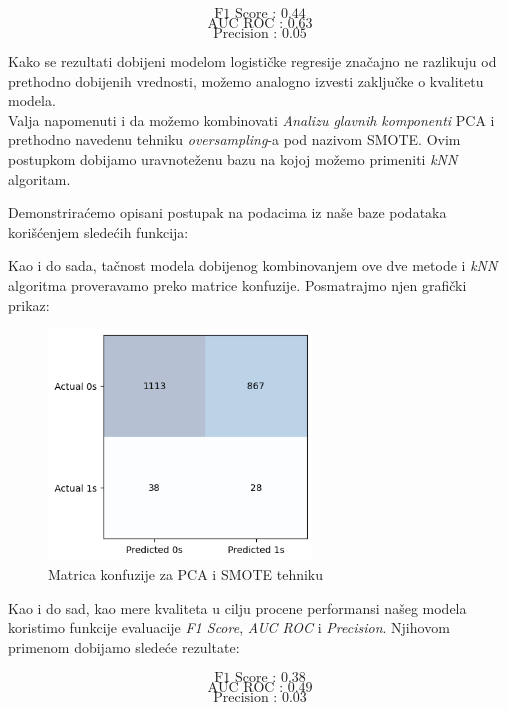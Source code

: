 \documentclass[12pt]{article}
\theoremstyle{definition}
\theoremstyle{remark}
\begin{document}
\hfill

$$
\text{F1 Score : 0.44}
$$
$$
\text{AUC ROC : 0.63}
$$
$$
\text{Precision : 0.05}
$$
\hfill

Kako se rezultati dobijeni modelom logističke regresije značajno ne razlikuju od prethodno dobijenih vrednosti, možemo analogno izvesti zaključke o kvalitetu modela.\\


Valja napomenuti i da možemo kombinovati \emph{Analizu glavnih komponenti} PCA i prethodno navedenu tehniku \emph{oversampling}-a pod nazivom SMOTE. Ovim postupkom dobijamo uravnoteženu bazu na kojoj možemo primeniti \emph{kNN} algoritam. 

Demonstriraćemo opisani postupak na podacima iz naše baze podataka korišćenjem sledećih funkcija:

\hfill


Kao i do sada, tačnost modela dobijenog kombinovanjem ove dve metode i \emph{kNN} algoritma proveravamo preko matrice konfuzije. Posmatrajmo njen grafički prikaz:
 
\begin{figure}[htp]
    \centering
    \includegraphics[width=7cm]{output_39_0.png}
    \caption{Matrica konfuzije za PCA i SMOTE tehniku}
    \label{fig:galaxy}
\end{figure}

\newpage

Kao i do sad, kao mere kvaliteta u cilju procene performansi našeg modela koristimo funkcije evaluacije  \emph{F1 Score}, \emph{AUC ROC} i \emph{Precision}. Njihovom primenom dobijamo sledeće rezultate:

\hfill

$$
\text{F1 Score : 0.38}
$$
$$
\text{AUC ROC : 0.49}
$$
$$
\text{Precision : 0.03}
$$
\hfill
\end{document}
